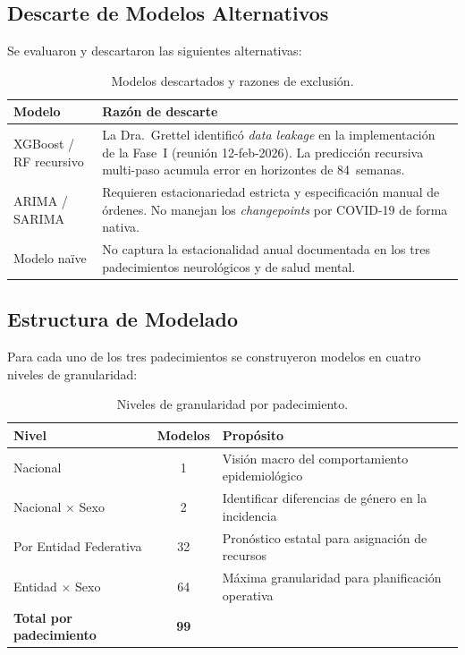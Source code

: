 \documentclass[11pt,a4paper]{article}
\begin{document}
\subsection{Descarte de Modelos Alternativos}\label{sec:descarte}

Se evaluaron y descartaron las siguientes alternativas:

\begin{table}[H]
\centering
\caption{Modelos descartados y razones de exclusión.}
\label{tab:descarte}
\begin{tabularx}{\textwidth}{@{}l X@{}}
\toprule
\textbf{Modelo} & \textbf{Razón de descarte} \\
\midrule
XGBoost / RF recursivo & La Dra.\ Grettel identificó \emph{data leakage} en la implementación de la Fase~I (reunión 12-feb-2026). La predicción recursiva multi-paso acumula error en horizontes de 84~semanas. \\
\addlinespace
ARIMA / SARIMA & Requieren estacionariedad estricta y especificación manual de órdenes. No manejan los \emph{changepoints} por COVID-19 de forma nativa. \\
\addlinespace
Modelo naïve & No captura la estacionalidad anual documentada en los tres padecimientos neurológicos y de salud mental. \\
\bottomrule
\end{tabularx}
\end{table}

\subsection{Estructura de Modelado}\label{sec:estructura}

Para cada uno de los tres padecimientos se construyeron modelos en cuatro niveles de granularidad:

\begin{table}[H]
\centering
\caption{Niveles de granularidad por padecimiento.}
\label{tab:niveles}
\begin{tabular}{@{}l c l@{}}
\toprule
\textbf{Nivel} & \textbf{Modelos} & \textbf{Propósito} \\
\midrule
Nacional & 1 & Visión macro del comportamiento epidemiológico \\
Nacional $\times$ Sexo & 2 & Identificar diferencias de género en la incidencia \\
Por Entidad Federativa & 32 & Pronóstico estatal para asignación de recursos \\
Entidad $\times$ Sexo & 64 & Máxima granularidad para planificación operativa \\
\addlinespace
\textbf{Total por padecimiento} & \textbf{99} & \\
\bottomrule
\end{tabular}
\end{table}
\end{document}
